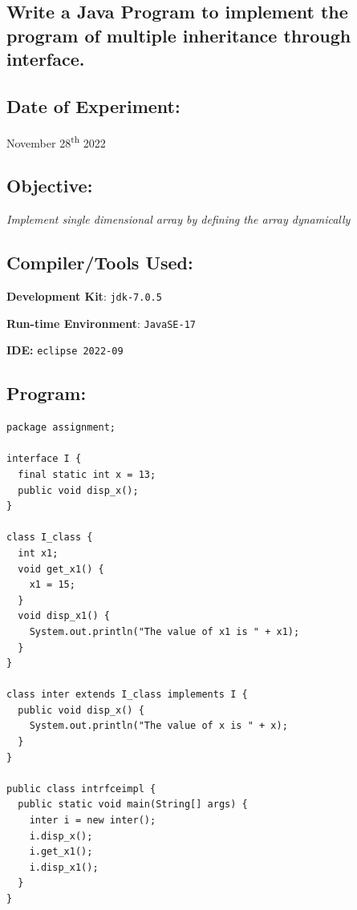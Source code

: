 \documentclass[12pt, a4paper]{article}
\begin{document}
\begin{tcolorbox}
\section{Write a Java Program to implement the program of multiple inheritance through interface.}
\end{tcolorbox}

\subsection*{Date of Experiment:}
November 28\textsuperscript{th} 2022

\subsection*{Objective:}
\emph{\large{Implement single dimensional array by defining the array dynamically}}

\subsection*{Compiler/Tools Used:}
\textbf{Development Kit}: \verb+jdk-7.0.5+

\textbf{Run-time Environment}: \verb+JavaSE-17+

\textbf{IDE:} \verb+eclipse 2022-09+

\subsection*{Program:}
\begin{lstlisting}
package assignment;

interface I {
  final static int x = 13;
  public void disp_x();
}

class I_class {
  int x1;
  void get_x1() {
    x1 = 15;
  }
  void disp_x1() {
    System.out.println("The value of x1 is " + x1);
  }
}

class inter extends I_class implements I {
  public void disp_x() {
    System.out.println("The value of x is " + x);
  }
}

public class intrfceimpl {
  public static void main(String[] args) {
    inter i = new inter();
    i.disp_x();
    i.get_x1();
    i.disp_x1();
  }
}
\end{lstlisting}
\end{document}
